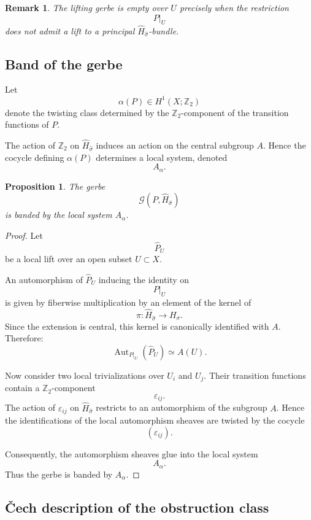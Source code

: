 \documentclass[11pt]{amsart}
\newtheorem{proposition}[definition]{Proposition}
\newtheorem{remark}[definition]{Remark}
\begin{document}
\begin{remark}
The lifting gerbe is empty over \(U\) precisely when the restriction
\[
P|_U
\]
does not admit a lift to a principal
\(\widehat H_{\widehat\sigma}\)-bundle.
\end{remark}

\subsection{Band of the gerbe}

Let
\[
\alpha(P)\in H^1(X;\mathbb Z_2)
\]
denote the twisting class determined by the \(\mathbb Z_2\)-component of the
transition functions of \(P\).

The action of \(\mathbb Z_2\) on
\(\widehat H_{\widehat\sigma}\) induces an action on the central subgroup
\(A\). Hence the cocycle defining \(\alpha(P)\) determines a local system,
denoted
\[
A_\alpha.
\]

\begin{proposition}
The gerbe
\[
\mathcal G(P,\widehat H_{\widehat\sigma})
\]
is banded by the local system \(A_\alpha\).
\end{proposition}

\begin{proof}
Let
\[
\widehat P_U
\]
be a local lift over an open subset \(U\subset X\).

An automorphism of \(\widehat P_U\) inducing the identity on
\[
P|_U
\]
is given by fiberwise multiplication by an element of the kernel of
\[
\pi:
\widehat H_{\widehat\sigma}\to H_\sigma.
\]
Since the extension is central, this kernel is canonically identified with
\(A\). Therefore:
\[
\operatorname{Aut}_{P|_U}(\widehat P_U)
\simeq
A(U).
\]

Now consider two local trivializations over \(U_i\) and \(U_j\). Their
transition functions contain a \(\mathbb Z_2\)-component
\[
\varepsilon_{ij}.
\]
The action of \(\varepsilon_{ij}\) on
\(\widehat H_{\widehat\sigma}\) restricts to an automorphism of the subgroup
\(A\). Hence the identifications of the local automorphism sheaves are twisted
by the cocycle
\[
(\varepsilon_{ij}).
\]

Consequently, the automorphism sheaves glue into the local system
\[
A_\alpha.
\]
Thus the gerbe is banded by \(A_\alpha\).
\end{proof}

\subsection{Čech description of the obstruction class}
\end{document}
